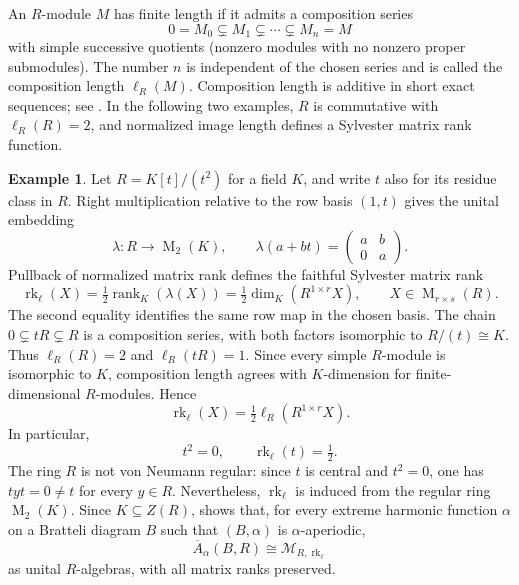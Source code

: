 \documentclass[11pt]{amsart}
\DeclareMathOperator{\rk}{rk}
\DeclareMathOperator{\Mat}{M}
\theoremstyle{definition}
\newtheorem{example}[theorem]{Example}
\theoremstyle{remark}
\begin{document}
An $R$-module $M$ has finite length if it admits a composition series
\[
 0=M_0\subsetneq M_1\subsetneq\cdots\subsetneq M_n=M
\]
with simple successive quotients (nonzero modules with no nonzero
proper submodules).  The number $n$ is independent of the chosen
series and is called the composition length $\ell_R(M)$.
Composition length is additive in short exact sequences; see
\cite[Chapter~6, Propositions~6.7--6.9]{AtiyahMacdonald1969}.
In the following two examples, $R$ is commutative with $\ell_R(R)=2$,
and normalized image length defines a Sylvester matrix rank function.

\begin{example}\label{ex:dual-number-rank}
Let $R=K[t]/(t^2)$ for a field $K$, and write $t$ also for its
residue class in $R$.
Right multiplication relative to the row basis $(1,t)$ gives
the unital embedding
\[
 \lambda:R\longrightarrow\Mat_2(K),\qquad
 \lambda(a+bt)=\begin{pmatrix}a&b\\0&a\end{pmatrix}.
\]
Pullback of normalized matrix rank defines the faithful Sylvester
matrix rank
\[
 \rk_\ell(X)=\tfrac12\operatorname{rank}_K(\lambda(X))
 =\tfrac12\dim_K(R^{1\times r}X),
 \qquad X\in\Mat_{r\times s}(R).
\]
The second equality identifies the same row map in the chosen basis.
The chain $0\subsetneq tR\subsetneq R$ is a composition series,
with both factors isomorphic to $R/(t)\cong K$.
Thus $\ell_R(R)=2$ and $\ell_R(tR)=1$.
Since every simple $R$-module is isomorphic to $K$,
composition length agrees with $K$-dimension for finite-dimensional
$R$-modules.  Hence
\[
 \rk_\ell(X)=\tfrac12\ell_R(R^{1\times r}X).
\]
In particular,
\[
 t^2=0,\qquad \rk_\ell(t)=\tfrac12.
\]
The ring $R$ is not von Neumann regular: since $t$ is central and
$t^2=0$, one has $tyt=0\ne t$ for every $y\in R$.
Nevertheless, $\rk_\ell$ is induced from the regular ring $\Mat_2(K)$.
Since $K\subseteq Z(R)$, 
shows that, for every extreme harmonic function $\alpha$ on a
Bratteli diagram $B$ such that $(B,\alpha)$ is $\alpha$-aperiodic,
\[
 \overline A_\alpha(B,R)\cong\mathcal M_{R,\rk_\ell}
\]
as unital $R$-algebras, with all matrix ranks preserved.
\end{example}
\end{document}

